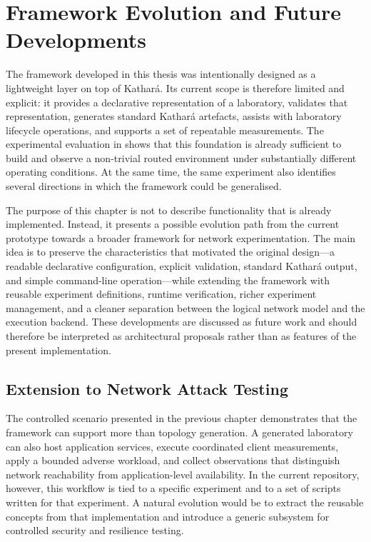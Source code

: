 \chapter{Framework Evolution and Future Developments}
\label{chap:future-developments}

The framework developed in this thesis was intentionally designed as a
lightweight layer on top of Kathar\'a. Its current scope is therefore limited
and explicit: it provides a declarative representation of a laboratory,
validates that representation, generates standard Kathar\'a artefacts, assists
with laboratory lifecycle operations, and supports a set of repeatable
measurements. The experimental evaluation in
 shows that this foundation is already
sufficient to build and observe a non-trivial routed environment under
substantially different operating conditions. At the same time, the same
experiment also identifies several directions in which the framework could be
generalised.

The purpose of this chapter is not to describe functionality that is already
implemented. Instead, it presents a possible evolution path from the current
prototype towards a broader framework for network experimentation. The main
idea is to preserve the characteristics that motivated the original design---a
readable declarative configuration, explicit validation, standard Kathar\'a
output, and simple command-line operation---while extending the framework with
reusable experiment definitions, runtime verification, richer experiment
management, and a cleaner separation between the logical network model and the
execution backend. These developments are discussed as future work and should
therefore be interpreted as architectural proposals rather than as features of
the present implementation.

\section{Extension to Network Attack Testing}
\label{sec:future-attack-testing}

The controlled scenario presented in the previous chapter demonstrates that the
framework can support more than topology generation. A generated laboratory can
also host application services, execute coordinated client measurements, apply
a bounded adverse workload, and collect observations that distinguish network
reachability from application-level availability. In the current repository,
however, this workflow is tied to a specific experiment and to a set of scripts
written for that experiment. A natural evolution would be to extract the
reusable concepts from that implementation and introduce a generic subsystem
for controlled security and resilience testing.

